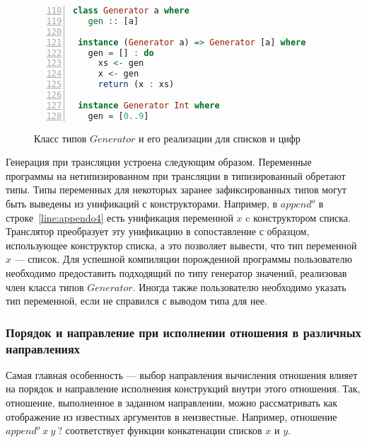 \begin{figure}[h!]
  \begin{center}
  \begin{minipage}{0.95\textwidth}
  \begin{lstlisting}[language=Haskell, frame=single, numbers=left,numberstyle=\small, firstnumber=118, escapechar=|]
 class Generator a where
   gen :: [a]

 instance (Generator a) => Generator [a] where
   gen = [] : do
     xs <- gen
     x <- gen
     return (x : xs)

 instance Generator Int where
   gen = [0..9]
    \end{lstlisting}
  \end{minipage}
  \end{center}
  \caption{Класс типов $Generator$ и его реализации для списков и цифр}
  \label{lst:generator}
\end{figure}

Генерация при трансляции устроена следующим образом.
Переменные программы на нетипизированном \miniKanren{} при трансляции в типизированный \haskell{} обретают типы.
Типы переменных для некоторых заранее зафиксированных типов могут быть выведены из унификаций с конструкторами.
Например, в $append^o$ в строке~\ref{line:appendo4} есть унификация переменной $x$ c конструктором списка.
Транслятор преобразует эту унификацию в сопоставление с образцом, использующее конструктор списка, а это позволяет \haskell{} вывести, что тип переменной $x$ --- список.
Для успешной компиляции порожденной программы пользователю необходимо предоставить подходящий по типу генератор значений, реализовав член класса типов $Generator$.
Иногда также пользователю необходимо указать тип переменной, если \haskell{} не справился с выводом типа для нее.


\subsubsection{Порядок и направление при исполнении отношения в различных направлениях}

Самая главная особенность --- выбор направления вычисления отношения влияет на порядок и направление исполнения конструкций внутри этого отношения.
Так, отношение, выполненное в заданном направлении, можно рассматривать как отображение из известных аргументов в неизвестные.
Например, отношение $append^o \ x \ y \ ?$ соответствует функции конкатенации списков $x$ и $y$.

